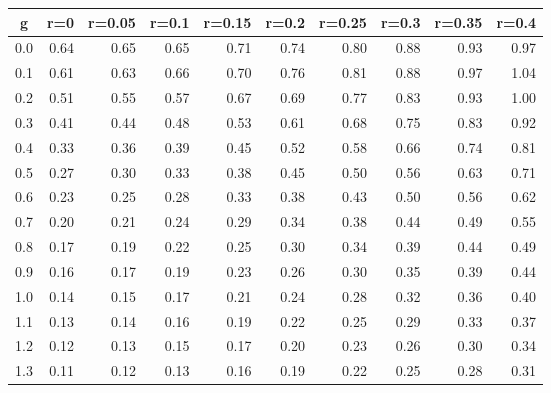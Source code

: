 %
\begin{table}[!tbp]
 \begin{center}
 \begin{tabular}{rrrrrrrrrr}\hline\hline
\multicolumn{1}{c}{g}&\multicolumn{1}{c}{r=0}&\multicolumn{1}{c}{r=0.05}&\multicolumn{1}{c}{r=0.1}&\multicolumn{1}{c}{r=0.15}&\multicolumn{1}{c}{r=0.2}&\multicolumn{1}{c}{r=0.25}&\multicolumn{1}{c}{r=0.3}&\multicolumn{1}{c}{r=0.35}&\multicolumn{1}{c}{r=0.4}\tabularnewline
\hline
0.0&0.64&0.65&0.65&0.71&0.74&0.80&0.88&0.93&0.97\tabularnewline
0.1&0.61&0.63&0.66&0.70&0.76&0.81&0.88&0.97&1.04\tabularnewline
0.2&0.51&0.55&0.57&0.67&0.69&0.77&0.83&0.93&1.00\tabularnewline
0.3&0.41&0.44&0.48&0.53&0.61&0.68&0.75&0.83&0.92\tabularnewline
0.4&0.33&0.36&0.39&0.45&0.52&0.58&0.66&0.74&0.81\tabularnewline
0.5&0.27&0.30&0.33&0.38&0.45&0.50&0.56&0.63&0.71\tabularnewline
0.6&0.23&0.25&0.28&0.33&0.38&0.43&0.50&0.56&0.62\tabularnewline
0.7&0.20&0.21&0.24&0.29&0.34&0.38&0.44&0.49&0.55\tabularnewline
0.8&0.17&0.19&0.22&0.25&0.30&0.34&0.39&0.44&0.49\tabularnewline
0.9&0.16&0.17&0.19&0.23&0.26&0.30&0.35&0.39&0.44\tabularnewline
1.0&0.14&0.15&0.17&0.21&0.24&0.28&0.32&0.36&0.40\tabularnewline
1.1&0.13&0.14&0.16&0.19&0.22&0.25&0.29&0.33&0.37\tabularnewline
1.2&0.12&0.13&0.15&0.17&0.20&0.23&0.26&0.30&0.34\tabularnewline
1.3&0.11&0.12&0.13&0.16&0.19&0.22&0.25&0.28&0.31\tabularnewline
\hline
\end{tabular}

\end{center}

\end{table}

